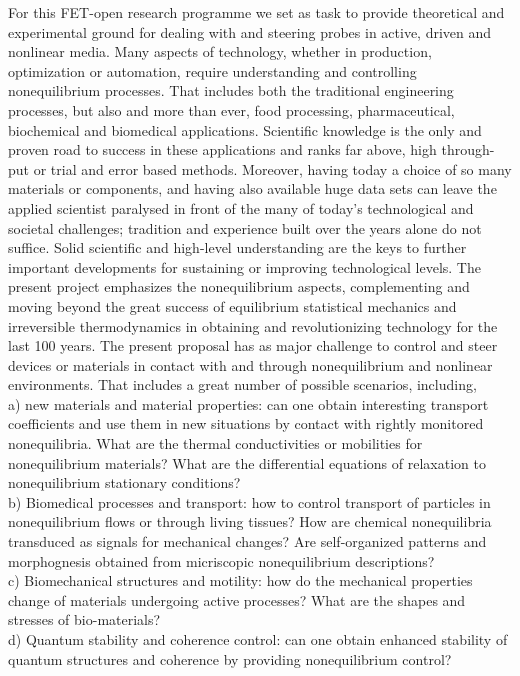 For this FET-open research programme we set as task to provide theoretical and experimental ground for dealing with and steering probes in active, driven and nonlinear media.
Many aspects of technology, whether in production, optimization or automation, require understanding and controlling nonequilibrium processes.  That includes both the traditional engineering processes, but also and more than ever, food processing, pharmaceutical, biochemical and biomedical applications.  Scientific knowledge is the only and proven road to success in these applications and ranks far above, high through-put or trial and error based methods.  Moreover, having today a choice of so many materials or components, and having also available huge data sets can leave the applied scientist paralysed in front of the many of today's technological and societal challenges; tradition and experience built over the years alone do not suffice.  Solid scientific and high-level understanding are the keys to further important developments for sustaining or improving technological levels.  The present project emphasizes the nonequilibrium aspects, complementing and moving beyond the great success of equilibrium statistical mechanics and irreversible thermodynamics in obtaining and revolutionizing technology for the last 100 years.
The present proposal has as major challenge to control and steer devices or materials in contact with and through nonequilibrium and nonlinear environments.  That includes a great number of possible scenarios, including,\\
a) new materials and material properties:  can one obtain interesting transport coefficients and use them in new situations by contact with rightly monitored nonequilibria.  What are the thermal conductivities or mobilities for nonequilibrium materials?  What are the differential equations of relaxation to nonequilibrium stationary conditions?\\
b) Biomedical processes and transport: how to control transport of particles in nonequilibrium flows or through living tissues?  How are chemical nonequilibria transduced as signals for mechanical changes? Are self-organized patterns and morphognesis obtained from micriscopic nonequilibrium descriptions?\\
c) Biomechanical structures and motility: how do the mechanical properties change of materials undergoing active processes?  What are the shapes and stresses of bio-materials?\\
d) Quantum stability and coherence control: can one obtain enhanced stability of quantum structures and coherence by providing nonequilibrium control?\\
